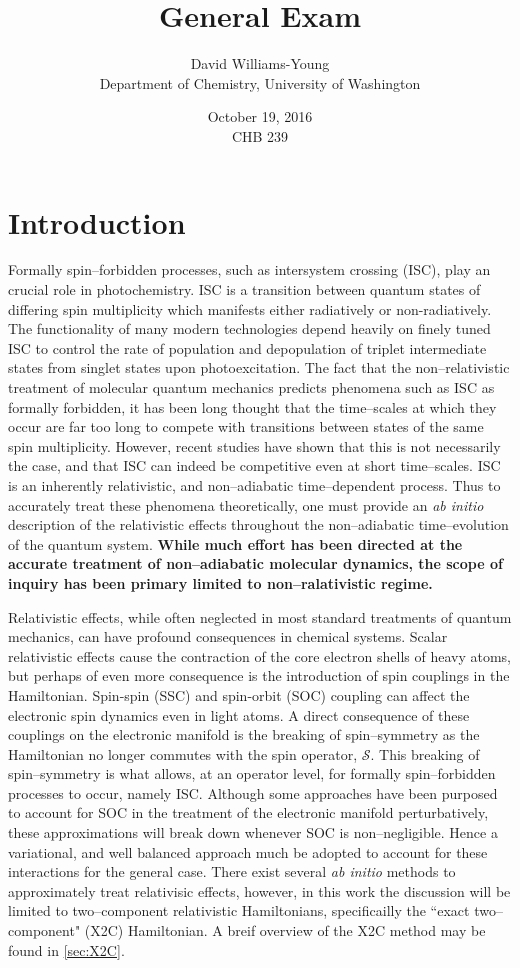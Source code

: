 \documentclass[12pt]{article}
\title{General Exam}
\date{October 19, 2016 \\ CHB 239}
\author{David Williams-Young\\ Department of Chemistry, University of Washington}
\newcommand*\op[1]{\mathcal{#1}}
\begin{document}
\linespread{1.0}
\maketitle
\linespread{1.5}

\newpage
\section{Introduction}

Formally spin--forbidden processes, such as intersystem crossing (ISC),  play
an crucial role in photochemistry. ISC is a transition between quantum states
of differing spin multiplicity which manifests either radiatively or
non-radiatively.  The functionality of many modern technologies depend heavily
on finely tuned ISC to control the rate of population and depopulation of
triplet intermediate states from singlet states upon photoexcitation. The fact
that the non--relativistic treatment of molecular quantum mechanics predicts
phenomena such as ISC as formally forbidden, it has been long thought that the
time--scales at which they occur are far too long to compete with transitions
between states of the same spin multiplicity. However, recent studies have
shown that this is not necessarily the case, and that ISC can indeed be
competitive even at short time--scales.  ISC is an inherently relativistic, and
non--adiabatic time--dependent process. Thus to accurately treat these phenomena
theoretically, one must provide an \emph{ab initio} description of the
relativistic effects throughout the non--adiabatic time--evolution of the
quantum system.  {\bf While much effort has been directed at the accurate
treatment of non--adiabatic molecular dynamics, the scope of inquiry has been
primary limited to non--ralativistic regime.}

Relativistic effects, while often neglected in most standard treatments of
quantum mechanics, can have profound consequences in chemical
systems.\cite{Pyykko12_45} Scalar relativistic effects cause the contraction of
the core electron shells of heavy atoms, but perhaps of even more consequence is
the introduction of spin couplings in the Hamiltonian.  Spin-spin (SSC) and
spin-orbit (SOC) coupling can affect the electronic spin dynamics even in light
atoms. A direct consequence of these couplings on the electronic manifold is the
breaking of spin--symmetry as the Hamiltonian no longer commutes with the spin
operator, $\op{S}$. This breaking of spin--symmetry is what allows, at an
operator level, for formally spin--forbidden processes to occur, namely
ISC. Although some approaches have been purposed to account for SOC in the
treatment of the electronic manifold perturbatively\cite{Thiel14_JCP124101},
these approximations will break down whenever SOC is non--negligible. Hence a
variational, and well balanced approach much be adopted to account for these
interactions for the general case. There exist several \emph{ab initio} methods
to approximately treat relativisic effects, however, in this work the discussion
will be limited to two--component relativistic Hamiltonians, specificailly the
``exact two--component" (X2C) Hamiltonian. A breif overview of the X2C method
may be found in \cref{sec:X2C}.
\end{document}

